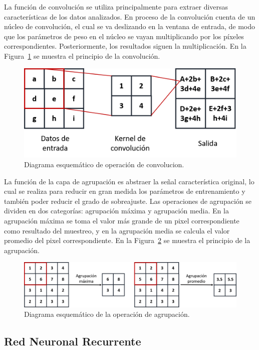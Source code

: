  La función de convolución se utiliza principalmente para extraer diversas características de los datos analizados. En proceso de la convolución cuenta de un núcleo de convolución, el cual se va deslizando en la ventana de entrada, de modo que los parámetros de peso en el núcleo se vayan multiplicando por los píxeles correspondientes. Posteriormente, los resultados siguen la multiplicación. En la Figura~\ref{fig:Convolution} se muestra el principio de la convolución.

 \begin{figure}[!h]
     \centering
     \includegraphics[width=.5\textwidth]{Imagenes/Convolucion.png}
     \caption{Diagrama esquemático de operación de convolucion.}
     \label{fig:Convolution}
 \end{figure}

 La función de la capa de agrupación es abstraer la señal característica original, lo cual se realiza para reducir en gran medida los parámetros de entrenamiento y también poder reducir el grado de sobreajuste. Las operaciones de agrupación se dividen en dos categorías: agrupación máxima y agrupación media. En la agrupación máxima se toma el valor más grande de un pixel correspondiente como resultado del muestreo, y en la agrupación media se calcula el valor promedio del pixel correspondiente. En la Figura~\ref{fig:Agrupacion} se muestra el principio de la agrupación.

  \begin{figure}[!h]
     \centering
     \includegraphics[width=.7\textwidth]{Imagenes/Agrupamiento.png}
     \caption{Diagrama esquemático de la operación de agrupación.}
     \label{fig:Agrupacion}
 \end{figure}

 \subsection{Red Neuronal Recurrente}

